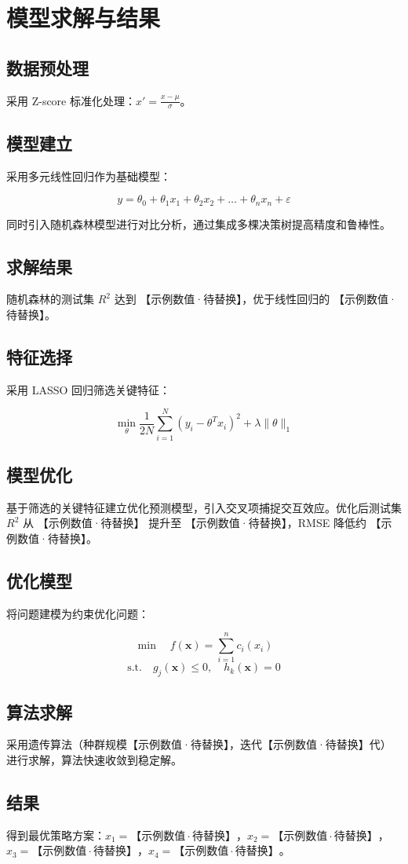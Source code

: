 \section{模型求解与结果}

\subsection{数据预处理}

采用 Z-score 标准化处理：$x' = \frac{x - \mu}{\sigma}$。

\subsection{模型建立}

采用多元线性回归作为基础模型：

\[
  y = \theta_0 + \theta_1 x_1 + \theta_2 x_2 + \dots + \theta_n x_n + \varepsilon
\]

同时引入随机森林模型进行对比分析，通过集成多棵决策树提高精度和鲁棒性。

\subsection{求解结果}

随机森林的测试集 $R^2$ 达到 【示例数值·待替换】，优于线性回归的 【示例数值·待替换】。

\subsection{特征选择}

采用 LASSO 回归筛选关键特征：

\[
  \min_{\theta} \frac{1}{2N} \sum_{i=1}^{N} (y_i - \theta^T x_i)^2 + \lambda \|\theta\|_1
\]

\subsection{模型优化}

基于筛选的关键特征建立优化预测模型，引入交叉项捕捉交互效应。优化后测试集 $R^2$ 从 【示例数值·待替换】 提升至 【示例数值·待替换】，RMSE 降低约 【示例数值·待替换】。

\subsection{优化模型}

将问题建模为约束优化问题：

\[
  \min \quad f(\mathbf{x}) = \sum_{i=1}^{n} c_i(x_i)
\]
\[
  \text{s.t.} \quad g_j(\mathbf{x}) \leq 0, \quad h_k(\mathbf{x}) = 0
\]

\subsection{算法求解}

采用遗传算法（种群规模【示例数值·待替换】，迭代【示例数值·待替换】代）进行求解，算法快速收敛到稳定解。

\subsection{结果}

得到最优策略方案：$x_1 = 【示例数值·待替换】$，$x_2 = 【示例数值·待替换】$，$x_3 = 【示例数值·待替换】$，$x_4 = 【示例数值·待替换】$。
